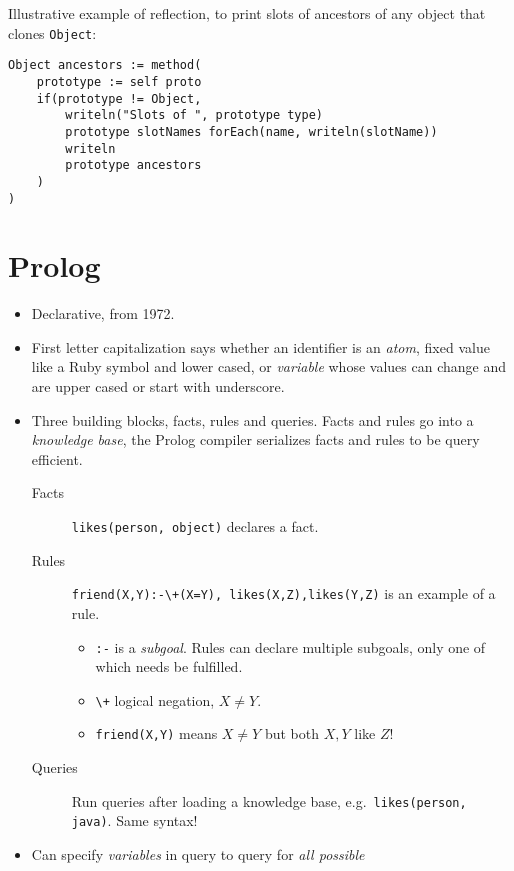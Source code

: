 \documentclass[10pt]{article}
\begin{document}
Illustrative example of reflection, to print slots of ancestors of any object
that clones \lstinline{Object}:
\begin{lstlisting}
Object ancestors := method(
    prototype := self proto
    if(prototype != Object,
        writeln("Slots of ", prototype type)
        prototype slotNames forEach(name, writeln(slotName))
        writeln
        prototype ancestors
    )
)
\end{lstlisting}

\section{Prolog}

\begin{itemize}
    \item Declarative, from 1972.
    \item First letter capitalization says whether an identifier is an
        \emph{atom}, fixed value like a Ruby symbol and lower cased, or
        \emph{variable} whose values can change and are upper cased or start
        with underscore.
    \item Three building blocks, facts, rules and queries. Facts and rules go
        into a \emph{knowledge base}, the Prolog compiler serializes facts and
        rules to be query efficient.
        \begin{description}
            \item[Facts] \lstinline{likes(person, object)} declares a fact.
            \item[Rules] \lstinline{friend(X,Y):-\+(X=Y), likes(X,Z),likes(Y,Z)}
                is an example of a rule.
                \begin{itemize}
                    \item \lstinline{:-} is a \emph{subgoal}. Rules can declare
                        multiple subgoals, only one of which needs be fulfilled.
                    \item \lstinline{\+} logical negation, $X \neq Y$.
                    \item \lstinline{friend(X,Y)} means $X \neq Y$ but both $X,
                        Y$ like $Z$!
                \end{itemize}
            \item[Queries] Run queries after loading a knowledge base, e.g.\
                \lstinline{likes(person, java)}. Same syntax!
        \end{description}
    \item Can specify \emph{variables} in query to query for \emph{all possible
}
\end{itemize}
\end{document}
